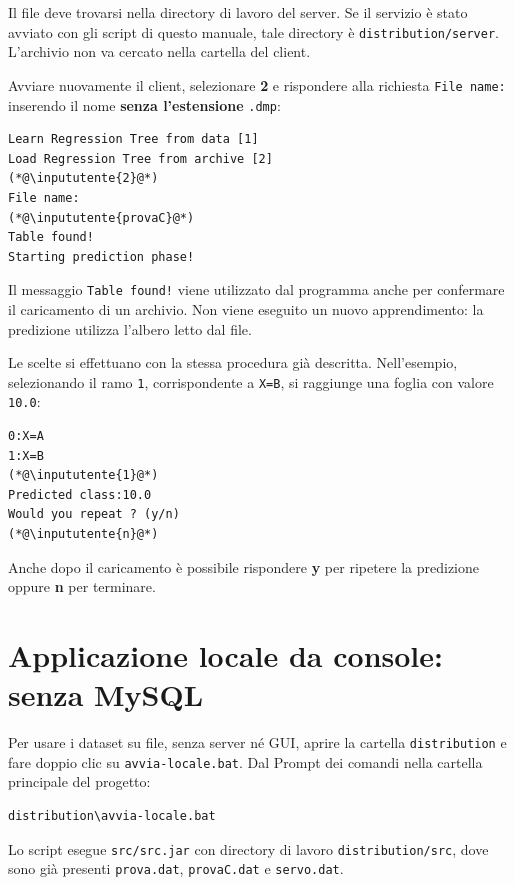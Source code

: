 \documentclass[11pt,a4paper]{article}
\begin{document}
Il file deve trovarsi nella directory di lavoro del server. Se il servizio è
stato avviato con gli script di questo manuale, tale directory è
\texttt{distribution/server}. L'archivio non va cercato nella cartella del
client.

Avviare nuovamente il client, selezionare \textbf{2} e rispondere alla richiesta
\texttt{File name:} inserendo il nome \textbf{senza l'estensione}
\texttt{.dmp}:

\begin{lstlisting}
Learn Regression Tree from data [1]
Load Regression Tree from archive [2]
(*@\inpututente{2}@*)
File name:
(*@\inpututente{provaC}@*)
Table found!
Starting prediction phase!
\end{lstlisting}

Il messaggio \texttt{Table found!} viene utilizzato dal programma anche per
confermare il caricamento di un archivio. Non viene eseguito un nuovo
apprendimento: la predizione utilizza l'albero letto dal file.

Le scelte si effettuano con la stessa procedura già descritta. Nell'esempio,
selezionando il ramo \texttt{1}, corrispondente a \texttt{X=B}, si raggiunge
una foglia con valore \texttt{10.0}:

\begin{lstlisting}
0:X=A
1:X=B
(*@\inpututente{1}@*)
Predicted class:10.0
Would you repeat ? (y/n)
(*@\inpututente{n}@*)
\end{lstlisting}

Anche dopo il caricamento è possibile rispondere \textbf{y} per ripetere la
predizione oppure \textbf{n} per terminare.



\clearpage
\section*{Applicazione locale da console: senza MySQL}

Per usare i dataset su file, senza server né GUI, aprire la cartella
\texttt{distribution} e fare doppio clic su \texttt{avvia-locale.bat}.
Dal Prompt dei comandi nella cartella principale del progetto:
\begin{lstlisting}
distribution\avvia-locale.bat
\end{lstlisting}

Lo script esegue \texttt{src/src.jar} con directory di lavoro
\texttt{distribution/src}, dove sono già presenti \texttt{prova.dat},
\texttt{provaC.dat} e \texttt{servo.dat}.
\end{document}
